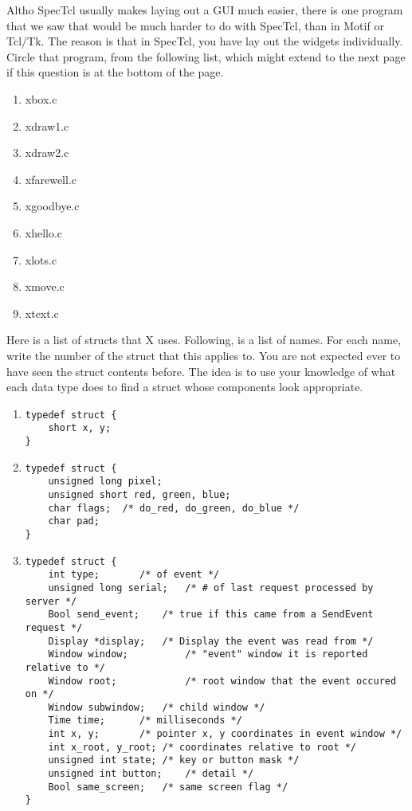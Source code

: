\documentclass[twoside]{article}
\begin{document}
\begin{enumerate}
 Altho SpecTcl usually makes laying out a GUI much easier, 
there is one program that we saw that would be much harder to do
with SpecTcl, than in Motif or Tcl/Tk.  The reason is that in
SpecTcl, you have lay out the widgets individually.  Circle that
program, from the following list, which might extend to the next
page if this question is at the bottom of the page.

\begin{enumerate}
\item xbox.c
\item xdraw1.c
\item xdraw2.c
\item xfarewell.c
\item xgoodbye.c
\item xhello.c
\item xlots.c
\item xmove.c
\item xtext.c
\end{enumerate}

 Here is a list of structs that X uses.  Following, is a 
list of names.  For each name, write the number of the struct
that this applies to.   You are not expected ever to have seen
the struct contents before.  The idea is to use your knowledge of 
what each data type does to find a struct whose components look
appropriate.

\begin{enumerate}
\item
\begin{verbatim}
typedef struct {
    short x, y;
} 
\end{verbatim}

\item
\begin{verbatim}
typedef struct {
	unsigned long pixel;
	unsigned short red, green, blue;
	char flags;  /* do_red, do_green, do_blue */
	char pad;
} 
\end{verbatim}

\item
\begin{verbatim}
typedef struct {
	int type;		/* of event */
	unsigned long serial;	/* # of last request processed by server */
	Bool send_event;	/* true if this came from a SendEvent request */
	Display *display;	/* Display the event was read from */
	Window window;	        /* "event" window it is reported relative to */
	Window root;	        /* root window that the event occured on */
	Window subwindow;	/* child window */
	Time time;		/* milliseconds */
	int x, y;		/* pointer x, y coordinates in event window */
	int x_root, y_root;	/* coordinates relative to root */
	unsigned int state;	/* key or button mask */
	unsigned int button;	/* detail */
	Bool same_screen;	/* same screen flag */
} 
\end{verbatim}


\end{enumerate}
\end{enumerate}
\end{document}
